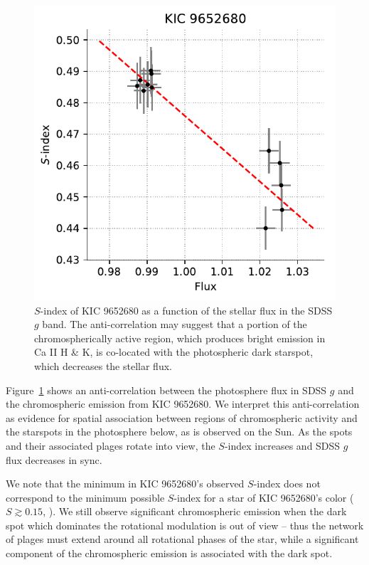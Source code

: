 \begin{figure}
\centering
    \includegraphics[scale=1]{nephelion/kic_sindex_vs_flux.pdf}
    \caption{$S$-index of KIC 9652680 as a function of the stellar flux in the SDSS $g$ band. The anti-correlation may suggest that a portion of the chromospherically active region, which produces bright emission in Ca II H \& K, is co-located with the photospheric dark starspot, which decreases the stellar flux.}
    \label{fig:sind_corr_kic}
\end{figure}

Figure~\ref{fig:sind_corr_kic} shows an anti-correlation between the photosphere flux in SDSS $g$ and the chromospheric emission from KIC 9652680. We interpret this anti-correlation as evidence for spatial association between regions of chromospheric activity and the starspots in the photosphere below, as is observed on the Sun. As the spots and their associated plages rotate into view, the $S$-index increases and SDSS $g$ flux decreases in sync.

We note that the minimum in KIC 9652680's observed $S$-index does not correspond to the minimum possible $S$-index for a star of KIC 9652680's color ($S\gtrsim 0.15$, \citealt[see e.g.][]{Isaacson2010}). We still observe significant chromospheric emission when the dark spot which dominates the rotational modulation is out of view -- thus the network of plages must extend around all rotational phases of the star, while a significant component of the chromospheric emission is associated with the dark spot.

